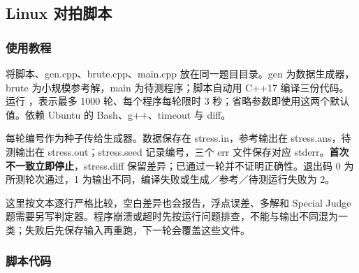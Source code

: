 \subsection{Linux 对拍脚本}
\label{other:stress-linux}
\subsubsection*{使用教程}
将脚本、gen.cpp、brute.cpp、main.cpp 放在同一题目目录。gen 为数据生成器，brute 为小规模参考解，main 为待测程序；脚本自动用 C++17 编译三份代码。运行 ，表示最多 1000 轮、每个程序每轮限时 3 秒；省略参数即使用这两个默认值。依赖 Ubuntu 的 Bash、g++、timeout 与 diff。

每轮编号作为种子传给生成器。数据保存在 stress.in，参考输出在 stress.ans，待测输出在 stress.out；stress.seed 记录编号，三个 err 文件保存对应 stderr。\textbf{首次不一致立即停止}，stress.diff 保留差异；已通过一轮并不证明正确性。退出码 0 为所测轮次通过，1 为输出不同，编译失败或生成／参考／待测运行失败为 2。

这里按文本逐行严格比较，空白差异也会报告，浮点误差、多解和 Special Judge 题需要另写判定器。程序崩溃或超时先按运行问题排查，不能与输出不同混为一类；失败后先保存输入再重跑，下一轮会覆盖这些文件。
\subsubsection*{脚本代码}

